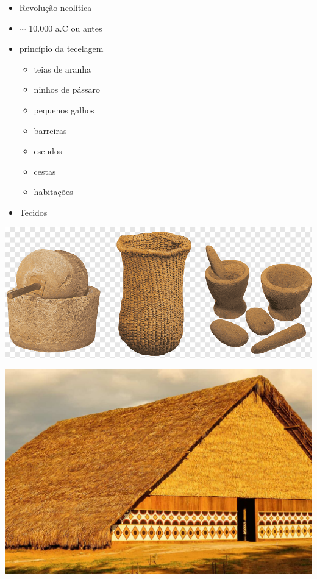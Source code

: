 \large
\begin{multicols}{2}
	\begin{itemize}
		\item Revolução neolítica
		\item $\sim$ 10.000 a.C ou antes
		\item princípio da tecelagem
		\normalsize
		\begin{itemize}
		\item teias de aranha
		\item ninhos de pássaro
		\item pequenos galhos
		\item barreiras
		\item escudos
		\item cestas
		\item habitações
		\end{itemize}
		 \item Tecidos
	
	\end{itemize}
	
	\vfill\null
\columnbreak

\vspace*{-15mm}
\begin{center}
	\includegraphics[width=.8\linewidth]{./IMG/png-transparent-neolithic-revolution-paleolithic-prehistory-mesolithic-homens-textile-pottery-revolution.png}
\end{center}

\begin{center}
	\includegraphics[width=.8\linewidth]{./IMG/revistaSIM_Arquitetura-Indigena_Destaque_Credito-Julio-Duarte_Shutterstock.com_-1155x770.jpg}
\end{center}



\end{multicols}
